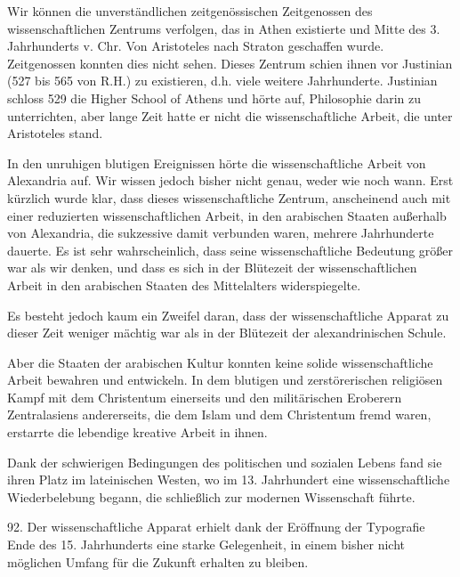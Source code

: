 \documentclass[11pt,a4paper]{book}
\begin{document}
Wir können die unverständlichen zeitgenössischen Zeitgenossen des wissenschaftlichen Zentrums verfolgen, das in Athen existierte und Mitte des 3. Jahrhunderts v. Chr. Von Aristoteles nach Straton geschaffen wurde. Zeitgenossen konnten dies nicht sehen. Dieses Zentrum schien ihnen vor Justinian (527 bis 565 von R.H.) zu existieren, d.h. viele weitere Jahrhunderte. Justinian schloss 529 die Higher School of Athens und hörte auf, Philosophie darin zu unterrichten, aber lange Zeit hatte er nicht die wissenschaftliche Arbeit, die unter Aristoteles stand.



In den unruhigen blutigen Ereignissen hörte die wissenschaftliche Arbeit von Alexandria auf. Wir wissen jedoch bisher nicht genau, weder wie noch wann. Erst kürzlich wurde klar, dass dieses wissenschaftliche Zentrum, anscheinend auch mit einer reduzierten wissenschaftlichen Arbeit, in den arabischen Staaten außerhalb von Alexandria, die sukzessive damit verbunden waren, mehrere Jahrhunderte dauerte. Es ist sehr wahrscheinlich, dass seine wissenschaftliche Bedeutung größer war als wir denken, und dass es sich in der Blütezeit der wissenschaftlichen Arbeit in den arabischen Staaten des Mittelalters widerspiegelte.



Es besteht jedoch kaum ein Zweifel daran, dass der wissenschaftliche Apparat zu dieser Zeit weniger mächtig war als in der Blütezeit der alexandrinischen Schule.



Aber die Staaten der arabischen Kultur konnten keine solide wissenschaftliche Arbeit bewahren und entwickeln. In dem blutigen und zerstörerischen religiösen Kampf mit dem Christentum einerseits und den militärischen Eroberern Zentralasiens andererseits, die dem Islam und dem Christentum fremd waren, erstarrte die lebendige kreative Arbeit in ihnen.



Dank der schwierigen Bedingungen des politischen und sozialen Lebens fand sie ihren Platz im lateinischen Westen, wo im 13. Jahrhundert eine wissenschaftliche Wiederbelebung begann, die schließlich zur modernen Wissenschaft führte.



92. Der wissenschaftliche Apparat erhielt dank der Eröffnung der Typografie Ende des 15. Jahrhunderts eine starke Gelegenheit, in einem bisher nicht möglichen Umfang für die Zukunft erhalten zu bleiben.
\end{document}
